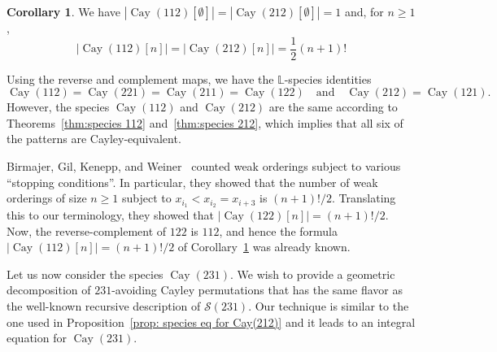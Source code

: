 \documentclass[a4paper, 11pt]{article}
\DeclareMathOperator{\Cay}{Cay}
\newcommand{\LL}{\mathbb{L}}
\newcommand{\Sym}{\mathcal{S}}
\theoremstyle{definition}
\newtheorem{corollary}[theorem]{Corollary}
\begin{document}
\begin{corollary}\label{cor: counting 212}
  We have $|\Cay(112)[\emptyset]|=|\Cay(212)[\emptyset]|=1$ and, for $n \geq 1$,
  \[
    \bigl|\Cay(112)[n]\bigr| = \bigl|\Cay(212)[n]\bigr| =  \frac{1}{2}(n+1)!
  \]
\end{corollary}

Using the reverse and complement maps, we have the $\LL$-species identities
$$
\Cay(112)=\Cay(221)=\Cay(211)=\Cay(122)
\quad\text{and}\quad
\Cay(212)=\Cay(121).
$$
However, the species $\Cay(112)$ and $\Cay(212)$ are the 
same according to Theorems~\ref{thm:species 112} and~\ref{thm:species 212},
which implies that all six of the patterns are Cayley-equivalent.

Birmajer, Gil, Kenepp, and Weiner~\cite{Birmajer-etal} counted weak
orderings subject to various ``stopping conditions''. In particular,
they showed that the number of weak orderings of size $n\ge 1$ subject to
$x_{i_1}<x_{i_2}=x_{i+3}$ is $(n+1)!/2$. Translating this to our
terminology, they showed that $|\Cay(122)[n]|=(n+1)!/2$.
Now, the
reverse-complement of $122$ is $112$, and hence the formula
$|\Cay(112)[n]|=(n+1)!/2$ of Corollary~\ref{cor: counting 212} was
already known.

Let us now consider the species $\Cay(231)$. We wish to provide a geometric
decomposition of $231$-avoiding Cayley permutations that has the same flavor
as the well-known recursive description of $\Sym(231)$. Our technique is
similar to the one used in Proposition~\ref{prop: species eq for Cay(212)}
and it leads to an integral equation for $\Cay(231)$.
\end{document}
